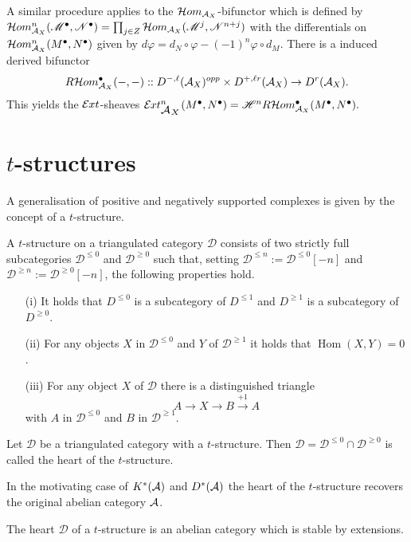 A similar procedure applies to the $\Hom_{\AA_X}$-bifunctor which is defined by
$\Hom_{\AA_X}^n(\M^\bullet, \N^\bullet) \ab = \prod_{j\in Z} \Hom_{\AA_X}(\M^j , \N^{n+j}) $
with the differentials on $\Hom_{\AA_X}^n(M^\bullet,N^\bullet)$ given by $d\varphi = d_N\circ \varphi - (-1)^n \varphi \circ d_M$.
There is a induced derived bifunctor
$$R\Hom_{\AA_X}^\bullet(\blank,\blank):: D^{-,\ell}(\AA_X)^{opp}\times D^{+,\ell r}(\AA_X)\to D^{r}(\AA_X).$$
This yields the $\Ext$-sheaves
$\Ex{\AA_X}{n}(M^\bullet,N^\bullet) = \H^n R\Hom_{\AA_X}^\bullet(M^\bullet, N^\bullet).$
\section{$t$-structures}
A generalisation of positive and negatively supported complexes is given by the concept of a $t$-structure.
\begin{definition}
 A $t$-structure on a triangulated category $\mathcal{D}$ consists of two strictly full subcategories $\mathcal{D}^{\leq 0}$ and $\mathcal{D}^{\geq 0}$ such that, setting $\mathcal{D}^{\leq n} := \mathcal{D}^{\leq 0}[-n]$ and $\mathcal{D}^{\geq n} := \mathcal{D}^{\geq 0} [-n]$, the following properties hold.
 \begin{enumerate}
   \item[(i)] It holds that $D^{\leq 0}$ is a subcategory of $D^{\leq 1}$ and $D^{\geq 1}$ is a subcategory of $D^{\geq 0}$.
   \item[(ii)] For any objects $X$ in $\mathcal{D}^{\leq 0}$ and $Y$ of $\mathcal{D}^{\geq 1}$ it holds that $\operatorname{Hom}(X,Y) = 0$.
   \item[(iii)] For any object $X$ of $\mathcal{D}$ there is a distinguished triangle
   $$A \to X \to B \xrightarrow{+1} A $$
   with $A$ in $\mathcal{D}^{\leq 0}$ and $B$ in $\mathcal{D}^{\geq 1}$.
 \end{enumerate}
\end{definition}
\begin{definition}
 Let $\mathcal{D}$ be a triangulated category with a $t$-structure. Then $\mathcal{D} = \mathcal{D}^{\leq 0} \cap \mathcal{D}^{\geq 0}$ is called the heart of the $t$-structure.
\end{definition}
In the motivating case of $K^*(\AA)$ and $D^*(\AA)$ the heart of the $t$-structure recovers the original abelian category $\AA$.
\begin{proposition}\label{prop: HeartExtension}
 The heart $\mathcal{D}$ of a $t$-structure is an abelian category which is stable by extensions.
\end{proposition}
